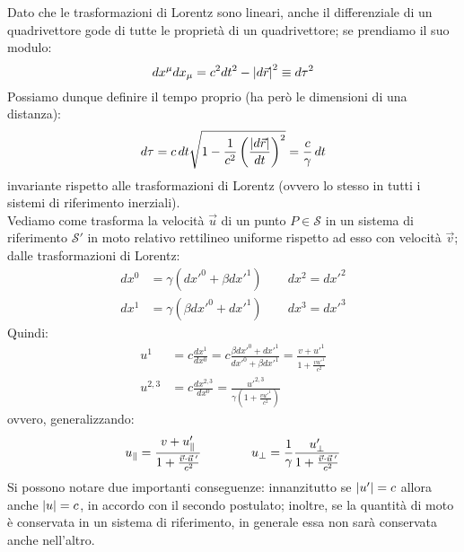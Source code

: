 Dato che le trasformazioni di Lorentz sono lineari, anche il differenziale di un quadrivettore gode di tutte le proprietà di un quadrivettore; se prendiamo il suo modulo:
\begin{equation}
	dx^{\mu}dx_{\mu} = c^2dt^2 - \left\lvert d\vec{r}\right\rvert^2 \equiv d\tau^2
	\label{eq:11}
\end{equation}
Possiamo dunque definire il tempo proprio (ha però le dimensioni di una distanza):
\begin{equation}
	d\tau = c \,dt \sqrt{1 - \displaystyle\frac{1}{c^2}\left(\displaystyle\frac{\left\lvert d\vec{r}\right\rvert}{dt}\right)^2} = \displaystyle\frac{c}{\gamma}\,dt
	\label{eq:12}
\end{equation}
invariante rispetto alle trasformazioni di Lorentz (ovvero lo stesso in tutti i sistemi di riferimento inerziali). \\ 
%
Vediamo come trasforma la velocità $ \vec{u} $ di un punto $ P \in \mathcal{S} $ in un sistema di riferimento $ \mathcal{S}' $ in moto relativo rettilineo uniforme rispetto ad esso con velocità $ \vec{v} $; dalle trasformazioni di Lorentz:
\begin{equation}
	\begin{split}
		dx^0 &= \gamma (dx'^0 + \beta dx'^1) \qquad dx^2 = dx'^2 \\ 
		dx^1 &= \gamma (\beta dx'^0 + dx'^1) \qquad dx^3 = dx'^3
	\end{split}
	\label{eq:13}
\end{equation}
Quindi:
\begin{equation}
	\begin{split}
		u^1 &= c \displaystyle\frac{dx^1}{dx^0} = c \displaystyle\frac{\beta dx'^0 + dx'^1}{dx'^0 + \beta dx'^1} = \displaystyle\frac{v + u'^1}{1 + \frac{vu'^1}{c^2}} \\ 
		u^{2,3} &= c \displaystyle\frac{dx^{2,3}}{dx^0} = \displaystyle\frac{u'^{2,3}}{\gamma (1 + \frac{vu'^1}{c^2})}
	\end{split}
	\label{eq:14}
\end{equation}
ovvero, generalizzando:
\begin{equation}
	u_{\parallel} = \displaystyle\frac{v + u'_{\parallel}}{1 + \frac{\vec{v}\cdot\vec{u}\,'}{c^2}} \qquad\qquad u_{\perp} = \displaystyle\frac{1}{\gamma}\displaystyle\frac{u'_{\perp}}{1 + \frac{\vec{v}\cdot\vec{u}\,'}{c^2}}
	\label{eq:15}
\end{equation}
Si possono notare due importanti conseguenze: innanzitutto se $ \left\lvert u'\right\rvert = c $ allora anche $ \left\lvert u\right\rvert = c $, in accordo con il secondo postulato; inoltre, se la quantità di moto è conservata in un sistema di riferimento, in generale essa non sarà conservata anche nell'altro. \\ 
